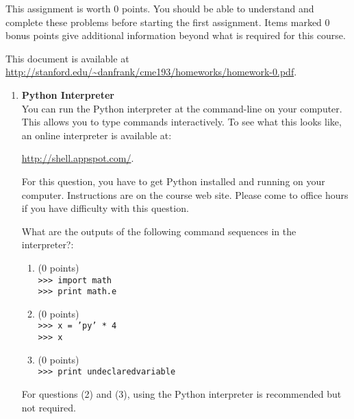 \documentclass{article}
\newcounter{points}
\newcommand\setzeropoints{\addtocounter{points}{0}(0 points)}
\begin{document}
\pagestyle{fancy}


This assignment is worth $0$ points.  You should be able to understand and complete these problems before starting the first assignment.  Items marked 0 bonus points give additional information beyond what is required for this course.

This document is available at \url{http://stanford.edu/~danfrank/cme193/homeworks/homework-0.pdf}.

\begin{enumerate}
\item \textbf{Python Interpreter} \\
You can run the Python interpreter at the command-line on your computer.  This allows you to type commands interactively.  To see what this looks like, an online interpreter is available at:
\begin{center}
\url{http://shell.appspot.com/}.
\end{center}
For this question, you have to get Python installed and running on your computer.  Instructions are on the course web site.  Please come to office hours if you have difficulty with this question.

What are the outputs of the following command sequences in the interpreter?:

\begin{enumerate}
\item \setzeropoints \\
\texttt{>>> import math} \\
\texttt{>>> print math.e}
\end{enumerate}

\begin{enumerate}
\setcounter{enumii}{1}
\item \setzeropoints \\
\texttt{>>> x = 'py' * 4} \\
\texttt{>>> x}
\end{enumerate}

\begin{enumerate}
\setcounter{enumii}{2}
\item \setzeropoints \\
\texttt{>>> print undeclaredvariable}
\end{enumerate}
For questions (2) and (3), using the Python interpreter is recommended but not required.


\end{enumerate}
\end{document}
